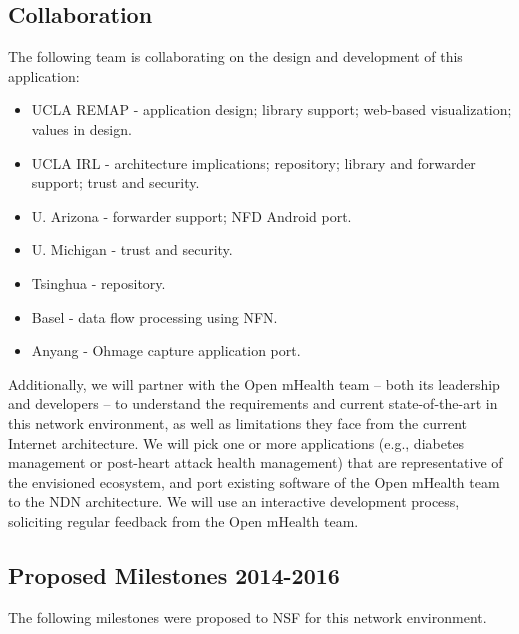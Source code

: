 \subsection{Collaboration}

The following team is collaborating on the design and development of this application: 

\begin{itemize}
\item UCLA REMAP - application design; library support; web-based visualization; values in design.
\item UCLA IRL - architecture implications; repository; library and forwarder support; trust and security. 
\item U. Arizona - forwarder support; NFD Android port. 
\item U. Michigan - trust and security.
\item Tsinghua - repository. 
\item Basel - data flow processing using NFN.
\item Anyang - Ohmage capture application port. 
\end{itemize}

Additionally, we will partner with the Open mHealth team -- both its leadership and
developers -- to understand the requirements and current state-of-the-art
in this network environment, as well as limitations they face from the
current Internet architecture. We will pick one or more 
applications (e.g., diabetes management or post-heart attack health management) 
that are representative of the envisioned ecosystem, and port existing software
of the Open mHealth team to the NDN architecture.  We will use an interactive
development process, soliciting regular feedback from the Open mHealth team.   


\subsection{Proposed Milestones 2014-2016}

The following milestones were proposed to NSF for this network environment. 


